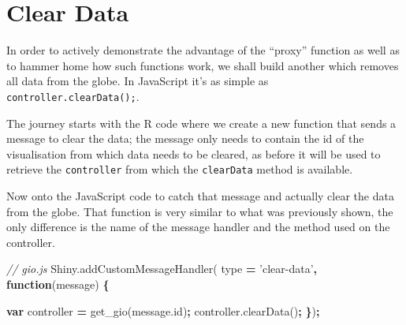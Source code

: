 \documentclass[10pt,]{krantz}
\makeatletter
\newenvironment{Shaded}{\begin{snugshade}}{\end{snugshade}}
\newcommand{\AttributeTok}[1]{\textcolor[rgb]{0.61,0.61,0.61}{#1}}
\newcommand{\CommentTok}[1]{\textcolor[rgb]{0.37,0.37,0.37}{\textit{#1}}}
\newcommand{\ControlFlowTok}[1]{\textcolor[rgb]{0.27,0.27,0.27}{\textbf{#1}}}
\newcommand{\DataTypeTok}[1]{\textcolor[rgb]{0.27,0.27,0.27}{#1}}
\newcommand{\KeywordTok}[1]{\textcolor[rgb]{0.27,0.27,0.27}{\textbf{#1}}}
\newcommand{\NormalTok}[1]{#1}
\newcommand{\OperatorTok}[1]{\textcolor[rgb]{0.43,0.43,0.43}{\textbf{#1}}}
\newcommand{\StringTok}[1]{\textcolor[rgb]{0.5,0.5,0.5}{#1}}
\newcommand{\VariableTok}[1]{\textcolor[rgb]{0,0,0}{#1}}
\newenvironment{kframe}{%
\medskip{}
\setlength{\fboxsep}{.8em}
 \def\at@end@of@kframe{}%
 \ifinner\ifhmode%
  \def\at@end@of@kframe{\end{minipage}}%
  \begin{minipage}{\columnwidth}%
 \fi\fi%
 \def\FrameCommand##1{\hskip\@totalleftmargin \hskip-\fboxsep
 \colorbox{shadecolor}{##1}\hskip-\fboxsep
     \hskip-\linewidth \hskip-\@totalleftmargin \hskip\columnwidth}%
 \MakeFramed {\advance\hsize-\width
   \@totalleftmargin\z@ \linewidth\hsize
   \@setminipage}}%
 {\par\unskip\endMakeFramed%
 \at@end@of@kframe}
\renewenvironment{Shaded}{\begin{kframe}}{\end{kframe}}
\makeatother
\begin{document}
\hypertarget{shiny-widgets-clear-data}{%
\section{Clear Data}\label{shiny-widgets-clear-data}}

In order to actively demonstrate the advantage of the ``proxy'' function as well as to hammer home how such functions work, we shall build another which removes all data from the globe. In JavaScript it's as simple as \texttt{controller.clearData();}.

The journey starts with the R code where we create a new function that sends a message to clear the data; the message only needs to contain the id of the visualisation from which data needs to be cleared, as before it will be used to retrieve the \texttt{controller} from which the \texttt{clearData} method is available.

\begin{Shaded}
\end{Shaded}

Now onto the JavaScript code to catch that message and actually clear the data from the globe. That function is very similar to what was previously shown, the only difference is the name of the message handler and the method used on the controller.

\begin{Shaded}
\begin{Highlighting}[]
\CommentTok{// gio.js}
\VariableTok{Shiny}\NormalTok{.}\AttributeTok{addCustomMessageHandler}\NormalTok{(}
\NormalTok{  type }\OperatorTok{=} \StringTok{'clear-data'}\OperatorTok{,} \KeywordTok{function}\NormalTok{(message) }\OperatorTok{\{}

    \KeywordTok{var}\NormalTok{ controller }\OperatorTok{=} \AttributeTok{get_gio}\NormalTok{(}\VariableTok{message}\NormalTok{.}\AttributeTok{id}\NormalTok{)}\OperatorTok{;}
    \VariableTok{controller}\NormalTok{.}\AttributeTok{clearData}\NormalTok{()}\OperatorTok{;}
\OperatorTok{\}}\NormalTok{)}\OperatorTok{;}
\end{Highlighting}
\end{Shaded}
\end{document}
